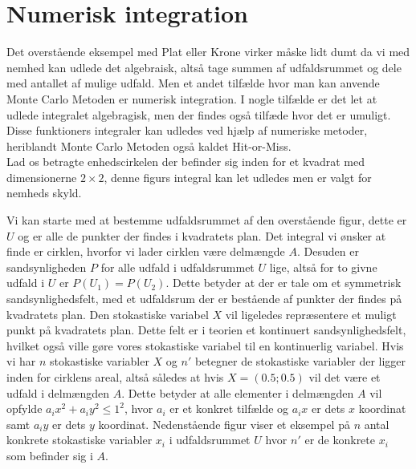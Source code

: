 \documentclass[../../SRP.tex]{subfiles}
\begin{document}
\section{Numerisk integration}

Det overstående eksempel med Plat eller Krone virker måske lidt dumt da vi med nemhed kan udlede det algebraisk, altså tage summen af udfaldsrummet og dele med antallet af mulige udfald. Men et andet tilfælde hvor man kan anvende Monte Carlo Metoden er numerisk integration. I nogle tilfælde er det let at udlede integralet algebragisk, men der findes også tilfæde hvor det er umuligt. Disse funktioners integraler kan udledes ved hjælp af numeriske metoder, heriblandt Monte Carlo Metoden også kaldet Hit-or-Miss. \cite{SBM} \\

Lad os betragte enhedscirkelen der befinder sig inden for et kvadrat med dimensionerne $2\times 2$, denne figurs integral kan let udledes men er valgt for nemheds skyld.\\



\begin{center}
\end{center}

Vi kan starte med at bestemme udfaldsrummet af den overstående figur, dette er $U$ og er alle de punkter der findes i kvadratets plan. Det integral vi ønsker at finde er cirklen, hvorfor vi lader cirklen være delmængde $A$. Desuden er sandsynligheden $P$ for alle udfald i udfaldsrummet $U$ lige, altså for to givne udfald i $U$ er $P(U_1) = P(U_2)$. Dette betyder at der er tale om et symmetrisk sandsynlighedsfelt, med et udfaldsrum der er bestående af punkter der findes på kvadratets plan. Den stokastiske variabel $X$ vil ligeledes repræsentere et muligt punkt på kvadratets plan. Dette felt er i teorien et kontinuert sandsynlighedsfelt, hvilket også ville gøre vores stokastiske variabel til en kontinuerlig variabel. Hvis vi har $n$ stokastiske variabler $X$ og $n'$ betegner de stokastiske variabler der ligger inden for cirklens areal, altså således at hvis $X = (0.5;0.5)$ vil det være et udfald i delmængden $A$. Dette betyder at alle elementer i delmængden $A$ vil opfylde $a_ix^2+a_iy^2 \leq 1^2$, hvor $a_i$ er et konkret tilfælde og $a_ix$ er dets $x$ koordinat samt $a_iy$ er dets $y$ koordinat. Nedenstående figur viser et eksempel på $n$ antal konkrete stokastiske variabler $x_i$ i udfaldsrummet $U$ hvor $n'$ er de konkrete $x_i$ som befinder sig i $A$.
\end{document}
